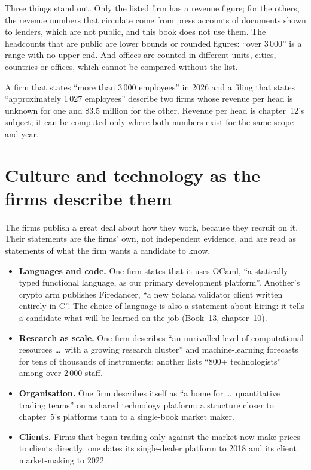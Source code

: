 Three things stand out. Only the listed firm has a revenue figure; for the others, the revenue numbers that circulate
come from press accounts of documents shown to lenders, which are not public, and this book does not use them. The
headcounts that are public are lower bounds or rounded figures: ``over 3\,000'' is a range with no upper end. And
offices are counted in different units, cities, countries or offices, which cannot be compared without the list.

\begin{remark}\label{rem:in:proprietary-market-makers-and-high-frequency-firms:heads}
A firm that states ``more than 3\,000 employees'' in 2026 and a filing that states ``approximately 1\,027 employees''
describe two firms whose revenue per head is unknown for one and \$3.5 million for the other. Revenue per head is chapter~12's subject; it can be computed only where both numbers exist for
the same scope and year.
\end{remark}

\section{Culture and technology as the firms describe them}

The firms publish a great deal about how they work, because they recruit on it. Their statements are the firms'
own, not independent evidence, and are read as statements of what the firm wants a candidate to know.
\begin{itemize}
\item \textbf{Languages and code.} One firm states that it uses OCaml, ``a statically typed functional language, as our
primary development platform''. Another's crypto arm publishes Firedancer, ``a new Solana validator client written
entirely in C''. The choice of language is also a statement about hiring: it tells a candidate what will be learned on
the job (Book~13, chapter~10).
\item \textbf{Research as scale.} One firm describes ``an unrivalled level of computational resources \dots\ with a
growing research cluster'' and machine-learning forecasts for tens of thousands of instruments; another lists ``800+
technologists'' among over 2\,000 staff.
\item \textbf{Organisation.} One firm describes itself as ``a home for \dots\ quantitative trading teams'' on a shared
technology platform: a structure closer to chapter~5's platforms than to a single-book market maker.
\item \textbf{Clients.} Firms that began trading only against the market now make prices to clients directly: one dates
its single-dealer platform to 2018 and its client market-making to 2022.
\end{itemize}

